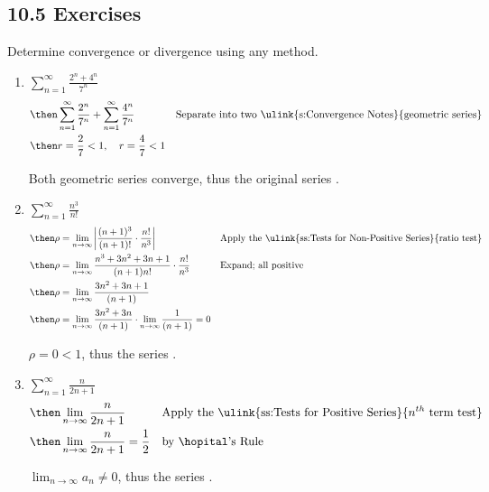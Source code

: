 \subsection{10.5 Exercises}
Determine convergence or divergence using any method.
\vspace{2em}
\begin{enumerate}[itemsep=3em]
  \item \(\displaystyle \sum_{n=1}^{\infty} \frac{2^n + 4^n }{7^n}\)
    \begin{align*}
      &\then
      \sum_{n=1}^{\infty} \frac{2^n}{7^n} +
      \sum_{n=1}^{\infty} \frac{4^n }{7^n}
      && \text{Separate into two \ulink{s:Convergence Notes}{geometric series}} \\
      &\then
      r = \frac{2}{7} < 1, \quad r = \frac{4}{7} < 1
    \end{align*}

    Both geometric series converge, thus the original series .

  \item \(\displaystyle \sum_{n=1}^{\infty} \frac{n^3}{n!} \)
    \begin{align*}
      &\then \rho = \lim_{n \to \infty} \left| \frac{(n+1)^3}{(n+1)!} \cdot
      \frac{n!}{n^3} \right|
      && \text{Apply the \ulink{ss:Tests for Non-Positive Series}{ratio test}} \\
      &\then \rho = \lim_{n \to \infty} \frac{n^3 + 3n^2 + 3n + 1}{(n+1)n!} \cdot
      \frac{n!}{n^3}
      && \text{Expand; all positive} \\
      &\then \rho = \lim_{n \to \infty} \frac{3n^2 + 3n + 1}{(n+1)} \\
      &\then \rho = \lim_{n \to \infty} \frac{3n^2 + 3n}{(n+1)} \cdot
      \lim_{n \to \infty} \frac{1}{(n+1)} = 0
    \end{align*}

    \(\rho = 0 < 1\), thus the series .

  \item \(\displaystyle \sum_{n=1}^{\infty} \frac{n}{2n+1} \)
    \begin{align*}
      &\then \lim_{n \to \infty} \frac{n}{2n+1}
      && \text{Apply the \ulink{ss:Tests for Positive Series}{\(n^{th} \) term test}} \\
      &\then \lim_{n \to \infty} \frac{n}{2n+1} = \frac{1}{2}
      && \text{by \hopital's Rule}
    \end{align*}

    \(\lim_{n \to \infty} a_n \neq 0\), thus the series .


\end{enumerate}
